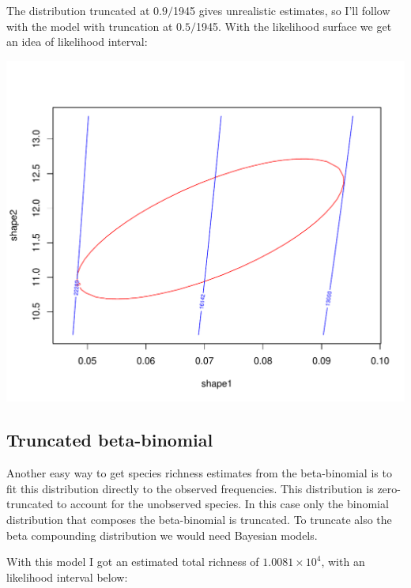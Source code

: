 \documentclass[12pt, A4]{article}\usepackage[]{graphicx}\usepackage[]{color}
\makeatletter
\def\maxwidth{ %
  \ifdim\Gin@nat@width>\linewidth
    \linewidth
  \else
    \Gin@nat@width
  \fi
}
\newenvironment{knitrout}{}{} %
\makeatother
\begin{document}
The distribution truncated at $0.9/$1945 gives unrealistic estimates,
so I'll follow with the model with truncation at $0.5/$1945.
With the likelihood surface we get an idea of likelihood interval:

\begin{knitrout}
\color{fgcolor}

{\centering \includegraphics[width=\maxwidth]{figure/beta_likelihood_surface-1} 

}



\end{knitrout}

\subsection*{Truncated beta-binomial}



Another easy way to get species richness estimates
from the beta-binomial is to fit this distribution
directly to the observed frequencies.
This distribution is zero-truncated to account for
the unobserved species. In this case only the
binomial distribution that composes the beta-binomial
is truncated. To truncate also the beta compounding distribution
we would need Bayesian models.

With this model I got an estimated total richness of
\ensuremath{1.0081\times 10^{4}}, with an likelihood interval below:
\end{document}
